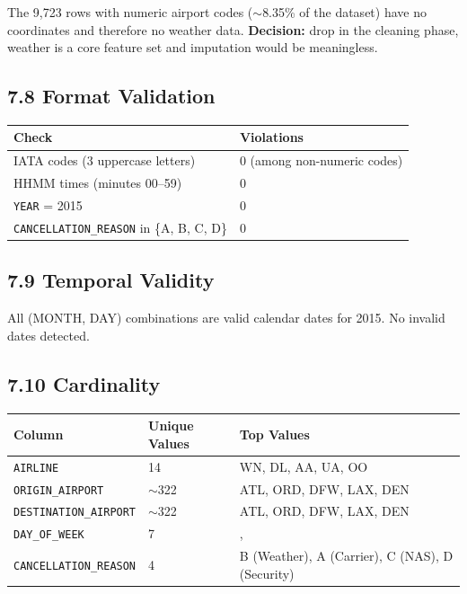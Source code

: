 \documentclass{article}
\newcommand{\code}[1]{\texttt{\small #1}}
\begin{document}
The 9,723 rows with numeric airport codes ($\sim$8.35\% of the dataset) have no coordinates and therefore no weather data. \textbf{Decision:} drop in the cleaning phase, weather is a core feature set and imputation would be meaningless.

\subsection*{\textcolor{accentgold}{7.8 Format Validation}}

\begin{tcolorbox}[mainbox, title={Format Checks}]
\renewcommand{\arraystretch}{1.4}
\begin{tabularx}{\textwidth}{X C{3cm}}
    \toprule
    \textbf{Check} & \textbf{Violations} \\
    \midrule
    IATA codes (3 uppercase letters)               & 0 (among non-numeric codes) \\
    HHMM times (minutes 00--59)                    & 0 \\
    \code{YEAR} = 2015                             & 0 \\
    \code{CANCELLATION\_REASON} in \{A, B, C, D\}  & 0 \\
    \bottomrule
\end{tabularx}
\end{tcolorbox}

\subsection*{\textcolor{accentgold}{7.9 Temporal Validity}}

All (MONTH, DAY) combinations are valid calendar dates for 2015. No invalid dates detected.

\subsection*{\textcolor{accentgold}{7.10 Cardinality}}

\begin{tcolorbox}[mainbox, title={Cardinality Summary}]
\renewcommand{\arraystretch}{1.4}
\begin{tabularx}{\textwidth}{L{5cm} C{2.5cm} X}
    \toprule
    \textbf{Column} & \textbf{Unique Values} & \textbf{Top Values} \\
    \midrule
    \code{AIRLINE}              & 14        & WN, DL, AA, UA, OO \\
    \code{ORIGIN\_AIRPORT}      & $\sim$322 & ATL, ORD, DFW, LAX, DEN \\
    \code{DESTINATION\_AIRPORT} & $\sim$322 & ATL, ORD, DFW, LAX, DEN \\
    \code{DAY\_OF\_WEEK}        & 7         &, \\
    \code{CANCELLATION\_REASON} & 4         & B (Weather), A (Carrier), C (NAS), D (Security) \\
    \bottomrule
\end{tabularx}
\end{tcolorbox}
\end{document}
